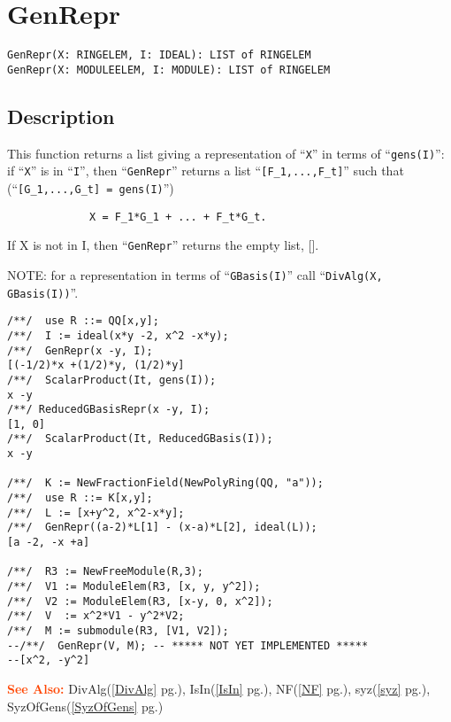 \documentclass[a4paper]{mybook}
\newenvironment{command}{}{} %
\newcommand\SeeAlso{\par\textcolor{OrangeRed}{\textbf{\large See Also: }}}
\begin{document}
\section{GenRepr}
\label{GenRepr}
\begin{command} %


\begin{Verbatim}[label=syntax, rulecolor=\color{MidnightBlue},
frame=single]
GenRepr(X: RINGELEM, I: IDEAL): LIST of RINGELEM
GenRepr(X: MODULEELEM, I: MODULE): LIST of RINGELEM
\end{Verbatim}


\subsection*{Description}

This function returns a list giving a representation of ``\verb&X&'' in terms of
``\verb&gens(I)&'': if ``\verb&X&'' is in ``\verb&I&'', then ``\verb&GenRepr&'' returns
a list ``\verb&[F_1,...,F_t]&'' such that (``\verb&[G_1,...,G_t] = gens(I)&'')
\begin{verbatim}
             X = F_1*G_1 + ... + F_t*G_t.
\end{verbatim}
If X is not in I, then ``\verb&GenRepr&'' returns the empty list, [].
\par 
NOTE: for a representation in terms of ``\verb&GBasis(I)&'' call ``\verb&DivAlg(X, GBasis(I))&''.
\begin{Verbatim}[label=example, rulecolor=\color{PineGreen}, frame=single]
/**/  use R ::= QQ[x,y];
/**/  I := ideal(x*y -2, x^2 -x*y);
/**/  GenRepr(x -y, I);
[(-1/2)*x +(1/2)*y, (1/2)*y]
/**/  ScalarProduct(It, gens(I));
x -y
/**/ ReducedGBasisRepr(x -y, I);
[1, 0]
/**/  ScalarProduct(It, ReducedGBasis(I));
x -y

/**/  K := NewFractionField(NewPolyRing(QQ, "a"));
/**/  use R ::= K[x,y];
/**/  L := [x+y^2, x^2-x*y];
/**/  GenRepr((a-2)*L[1] - (x-a)*L[2], ideal(L));
[a -2, -x +a]

/**/  R3 := NewFreeModule(R,3);
/**/  V1 := ModuleElem(R3, [x, y, y^2]);
/**/  V2 := ModuleElem(R3, [x-y, 0, x^2]);
/**/  V  := x^2*V1 - y^2*V2;
/**/  M := submodule(R3, [V1, V2]);
--/**/  GenRepr(V, M); -- ***** NOT YET IMPLEMENTED *****
--[x^2, -y^2]
\end{Verbatim}


\SeeAlso %
  DivAlg(\ref{DivAlg} pg.\pageref{DivAlg}), 
    IsIn(\ref{IsIn} pg.\pageref{IsIn}), 
    NF(\ref{NF} pg.\pageref{NF}), 
    syz(\ref{syz} pg.\pageref{syz}), 
    SyzOfGens(\ref{SyzOfGens} pg.\pageref{SyzOfGens})
\end{command} %
\end{document}
